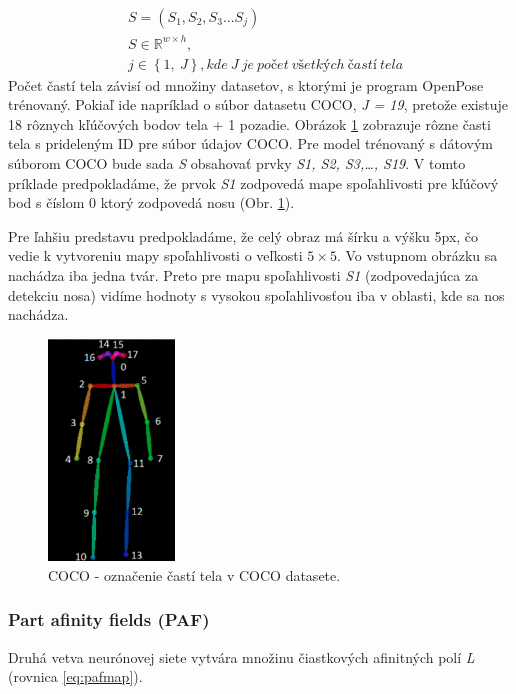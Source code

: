 \documentclass[slovak,master,dept460,male,cpp,cpdeclaration]{diploma}
\begin{document}
\begin{eqnarray}
& S = (S_{1}, S_{2}, S_{3} ... S_{j}) \label{eq:confidencemap}\\
& S\in\mathbb{R}^{w \times  h},\nonumber\\
& j\in \left \{1,\: J  \right \}, kde\: J\: je\: počet\: všetkých\: častí\: tela\nonumber
\end{eqnarray}
Počet častí tela závisí od množiny datasetov, s ktorými je program OpenPose trénovaný. Pokiaľ ide napríklad o súbor datasetu COCO\cite{lin2014microsoft}, \textit{J = 19}, pretože existuje 18 rôznych kľúčových bodov tela + 1 pozadie. Obrázok \ref{fig:cocoDataset} zobrazuje rôzne časti tela s prideleným ID pre súbor údajov COCO. Pre model trénovaný s dátovým súborom COCO bude sada \textit{S} obsahovať prvky \textit{S1, S2, S3,…, S19}. V tomto príklade predpokladáme, že prvok \textit{S1} zodpovedá mape spoľahlivosti pre kľúčový bod s číslom 0 ktorý zodpovedá nosu (Obr. \ref{fig:cocoDataset}).\par Pre ľahšiu predstavu predpokladáme, že celý obraz má šírku a výšku 5px, čo vedie k vytvoreniu  mapy spoľahlivosti o veľkosti \textit{$5\times 5$}. Vo vstupnom obrázku sa nachádza iba jedna tvár. Preto pre mapu spoľahlivosti \textit{S1} (zodpovedajúca za detekciu nosa) vidíme hodnoty s vysokou spoľahlivosťou iba v oblasti, kde sa nos nachádza.\bigskip

\begin{figure}[H]
	\centering
	\includegraphics[width=0.3\textwidth]{Figures/cocoDataset.png}
	\caption{COCO - označenie častí tela v COCO datasete.\cite{cocoDataset}}
	\label{fig:cocoDataset}
\end{figure}


\subsubsection{Part afinity fields (PAF)}
Druhá vetva neurónovej siete vytvára množinu čiastkových afinitných polí \textit{L} (rovnica \ref{eq:pafmap}).
\end{document}
